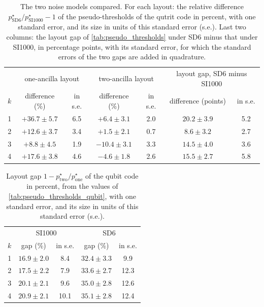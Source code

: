 \begin{table}[tp]
  \centering
  \small
  \begin{tabular}{c|cc|cc|cc}
    \hline
    & \multicolumn{2}{c|}{one-ancilla layout} & \multicolumn{2}{c|}{two-ancilla layout} & \multicolumn{2}{c}{layout gap, SD6 minus SI1000} \\
    $k$ & difference (\%) & in s.e. & difference (\%) & in s.e. & difference (points) & in s.e. \\
    \hline
    1 & $+36.7 \pm 5.7$ & 6.5 & $+6.4 \pm 3.1$ & 2.0 & $20.2 \pm 3.9$ & 5.2 \\
    2 & $+12.6 \pm 3.7$ & 3.4 & $+1.5 \pm 2.1$ & 0.7 & $8.6 \pm 3.2$ & 2.7 \\
    3 & $+8.8 \pm 4.5$ & 1.9 & $-10.4 \pm 3.1$ & 3.3 & $14.5 \pm 4.0$ & 3.6 \\
    4 & $+17.6 \pm 3.8$ & 4.6 & $-4.6 \pm 1.8$ & 2.6 & $15.5 \pm 2.7$ & 5.8 \\
    \hline
  \end{tabular}
  \caption{The two noise models compared. For each layout: the relative difference $p^\star_{\mathrm{SD6}}/p^\star_{\mathrm{SI1000}} - 1$ of the pseudo-thresholds of the qutrit code in percent, with one standard error, and its size in units of this standard error (s.e.). Last two columns: the layout gap of \autoref{tab:pseudo_thresholds} under SD6 minus that under SI1000, in percentage points, with its standard error, for which the standard errors of the two gaps are added in quadrature.}
  \label{tab:model_ratio}
\end{table}

\begin{table}[tp]
  \centering
  \small
  \begin{tabular}{c|cc|cc}
    \hline
    & \multicolumn{2}{c|}{SI1000} & \multicolumn{2}{c}{SD6} \\
    $k$ & gap (\%) & in s.e. & gap (\%) & in s.e. \\
    \hline
    1 & $16.9 \pm 2.0$ & 8.4 & $32.4 \pm 3.3$ & 9.9 \\
    2 & $17.5 \pm 2.2$ & 7.9 & $33.6 \pm 2.7$ & 12.3 \\
    3 & $20.1 \pm 2.1$ & 9.6 & $35.0 \pm 2.8$ & 12.6 \\
    4 & $20.9 \pm 2.1$ & 10.1 & $35.1 \pm 2.8$ & 12.4 \\
    \hline
  \end{tabular}
  \caption{Layout gap $1 - p^\star_{\mathrm{two}}/p^\star_{\mathrm{one}}$ of the qubit code in percent, from the values of \autoref{tab:pseudo_thresholds_qubit}, with one standard error, and its size in units of this standard error (s.e.).}
  \label{tab:qubit_layout_gap}
\end{table}

